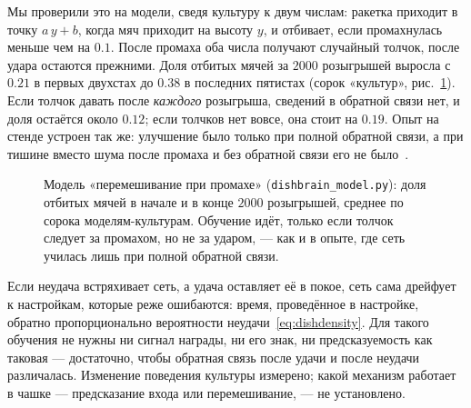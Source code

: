 Мы проверили это на модели, сведя культуру к двум числам: ракетка приходит в точку $a\,y+b$, когда мяч приходит на высоту $y$, и отбивает, если промахнулась меньше чем на $0.1$. После промаха оба числа получают случайный толчок, после удара остаются прежними. Доля отбитых мячей за $2000$ розыгрышей выросла с $0.21$ в первых двухстах до $0.38$ в последних пятистах (сорок «культур», рис.~\ref{fig:dishmodel}). Если толчок давать после \emph{каждого} розыгрыша, сведений в обратной связи нет, и доля остаётся около $0.12$; если толчков нет вовсе, она стоит на $0.19$. Опыт на стенде устроен так же: улучшение было только при полной обратной связи, а при тишине вместо шума после промаха и без обратной связи его не было~\cite{Kagan2022}.

\begin{figure}[t]
\centering
{}
\caption{Модель «перемешивание при промахе» (\texttt{dishbrain\_model.py}): доля отбитых мячей в начале и в конце $2000$ розыгрышей, среднее по сорока моделям-культурам. Обучение идёт, только если толчок следует за промахом, но не за ударом, --- как и в опыте, где сеть училась лишь при полной обратной связи.}
\label{fig:dishmodel}
\end{figure}

\begin{keyblock}
\begin{proposition}
\label{prop:dishscramble}
Если неудача встряхивает сеть, а удача оставляет её в покое, сеть сама дрейфует к настройкам, которые реже ошибаются: время, проведённое в настройке, обратно пропорционально вероятности неудачи~\eqref{eq:dishdensity}. Для такого обучения не нужны ни сигнал награды, ни его знак, ни предсказуемость как таковая --- достаточно, чтобы обратная связь после удачи и после неудачи различалась. Изменение поведения культуры измерено; какой механизм работает в чашке --- предсказание входа или перемешивание, --- не установлено.
\end{proposition}
\end{keyblock}


